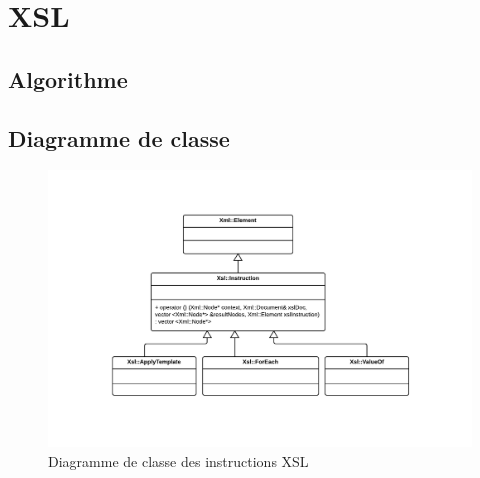 \chapter{XSL}

\section{Algorithme}

\section{Diagramme de classe}
\begin{landscape}
\begin{figure}[h!]
    \centering
    \includegraphics[width=\linewidth]{images/xsl-uml.pdf}
    \caption{Diagramme de classe des instructions XSL}
    \label{xslClassDiagram}
\end{figure}
\end{landscape}
